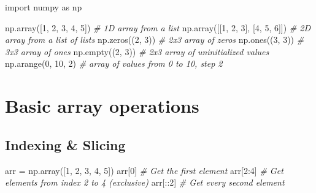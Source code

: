 \documentclass[11pt]{article}
\newenvironment{Shaded}{}{}
\newcommand{\DecValTok}[1]{\textcolor[rgb]{0.25,0.63,0.44}{{#1}}}
\newcommand{\CommentTok}[1]{\textcolor[rgb]{0.38,0.63,0.69}{\textit{{#1}}}}
\newcommand{\NormalTok}[1]{{#1}}
\newcommand{\ImportTok}[1]{{#1}}
\newcommand{\OperatorTok}[1]{\textcolor[rgb]{0.40,0.40,0.40}{{#1}}}
\begin{document}
\begin{Shaded}
\begin{Highlighting}[]
    \ImportTok{import}\NormalTok{ numpy }\ImportTok{as}\NormalTok{ np}

\NormalTok{    np.array([}\DecValTok{1}\NormalTok{, }\DecValTok{2}\NormalTok{, }\DecValTok{3}\NormalTok{, }\DecValTok{4}\NormalTok{, }\DecValTok{5}\NormalTok{])           }\CommentTok{\# 1D array   from a list}
\NormalTok{    np.array([[}\DecValTok{1}\NormalTok{, }\DecValTok{2}\NormalTok{, }\DecValTok{3}\NormalTok{], [}\DecValTok{4}\NormalTok{, }\DecValTok{5}\NormalTok{, }\DecValTok{6}\NormalTok{]])    }\CommentTok{\# 2D array from a list of lists}
\NormalTok{    np.zeros((}\DecValTok{2}\NormalTok{, }\DecValTok{3}\NormalTok{))                    }\CommentTok{\# 2x3 array of zeros}
\NormalTok{    np.ones((}\DecValTok{3}\NormalTok{, }\DecValTok{3}\NormalTok{))                     }\CommentTok{\# 3x3 array of ones}
\NormalTok{    np.empty((}\DecValTok{2}\NormalTok{, }\DecValTok{3}\NormalTok{))                    }\CommentTok{\# 2x3 array of uninitialized values}
\NormalTok{    np.arange(}\DecValTok{0}\NormalTok{, }\DecValTok{10}\NormalTok{, }\DecValTok{2}\NormalTok{)                 }\CommentTok{\# array of values from 0 to 10, step 2}
\end{Highlighting}
\end{Shaded}

\section{\texorpdfstring{{Basic array
operations}}{Basic array operations}}\label{basic-array-operations}

\subsection{\texorpdfstring{{Indexing \&
Slicing}}{Indexing \& Slicing}}\label{indexing-slicing}

\begin{Shaded}
\begin{Highlighting}[]
\NormalTok{    arr }\OperatorTok{=}\NormalTok{ np.array([}\DecValTok{1}\NormalTok{, }\DecValTok{2}\NormalTok{, }\DecValTok{3}\NormalTok{, }\DecValTok{4}\NormalTok{, }\DecValTok{5}\NormalTok{])}
\NormalTok{    arr[}\DecValTok{0}\NormalTok{]       }\CommentTok{\# Get the first element}
\NormalTok{    arr[}\DecValTok{2}\NormalTok{:}\DecValTok{4}\NormalTok{]     }\CommentTok{\# Get elements from index 2 to 4 (exclusive)}
\NormalTok{    arr[::}\DecValTok{2}\NormalTok{]     }\CommentTok{\# Get every second element}
\end{Highlighting}
\end{Shaded}
\end{document}
